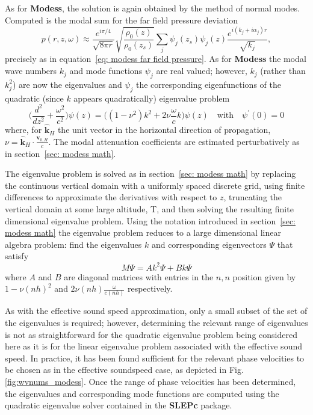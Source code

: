 As for {\bf Modess}, the solution is again obtained by the method of normal modes. Computed is the modal sum for the far field pressure deviation 
\[
p(r,z,\omega)
\approx
\frac{e^{i \pi /4}}{\sqrt{8 \pi r}} \sqrt{\frac {\rho_0(z)} {\rho_0(z_s)}} \sum_j\psi_j(z_s)\psi_j(z) \frac{e^{i (k_j+i\alpha_j)r}}{\sqrt{k_j}},
\]
precisely as in equation~\ref{eq: modess far field pressure}. As for {\bf Modess} the modal wave numbers $k_j$ and mode functions $\psi_j$ are real valued; however, $k_j$ (rather than $k_j^2$) are now the eigenvalues and $\psi_j$ the corresponding eigenfunctions of the quadratic (since $k$ appears quadratically) eigenvalue problem 
\[
\Big( 
\frac{d^2}{dz^2} +\frac{\omega^2}{c^2}
\Big)\psi(z) 
= 
\Big((1-\nu^2)k^2+2\nu\frac{\omega}{c}k\Big)\psi(z) 
\quad \text{with} \quad 
\psi^\prime(0)=0 
\]
where, for $\hat{\textbf{k}}_{H}$ the unit vector in the horizontal direction of propagation, $\nu=\hat{\textbf{k}}_{H}\cdot\frac{\textbf{v}_{0,H}}{c}$. The modal attenuation coefficients are estimated perturbatively as in section~\ref{sec: modess math}. 

The eigenvalue problem is solved as in section~\ref{sec: modess math} by replacing the continuous vertical domain with a uniformly spaced discrete grid, using finite differences to approximate the derivatives with respect to $z$, truncating the vertical domain at some large altitude, T, and then solving the resulting finite dimensional eigenvalue problem. Using the notation introduced in section~\ref{sec: modess math} the eigenvalue problem reduces to a large dimensional linear algebra problem: find the eigenvalues $k$ and corresponding eigenvectors $\Psi$ that satisfy 
\[
M\Psi=Ak^2\Psi+Bk\Psi
\]
where $A$ and $B$ are diagonal matrices with entries in the $n,n$ position given by $1-\nu(nh)^2$ and $2\nu(nh)\frac{\omega}{c(nh)}$ respectively. 

As with the effective sound speed approximation, only a small subset of the set of the eigenvalues is required; however, determining the relevant range of eigenvalues is not as straightforward for the quadratic eigenvalue problem being considered here as it is for the linear eigenvalue problem associated with the effective sound speed. In practice, it has been found sufficient for the relevant phase velocities to be chosen as in the effective soundspeed case, as depicted in Fig.\,\ref{fig:wvnums_modess}. Once the range of phase velocities has been determined, the eigenvalues and corresponding mode functions are computed using the quadratic eigenvalue solver contained in the \textbf{SLEPc} package. 


